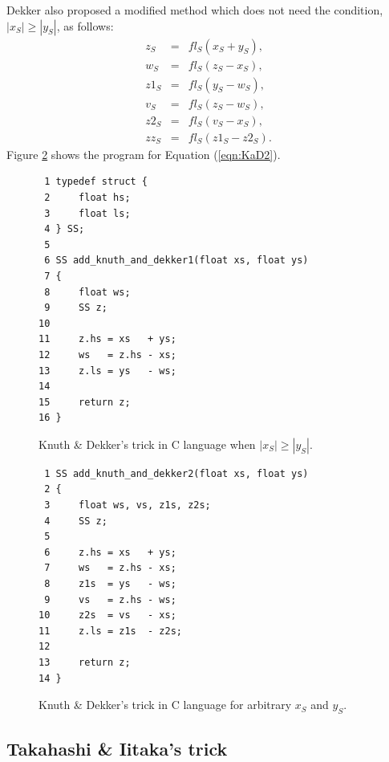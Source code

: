 Dekker also proposed a modified method which does not need the
condition, $|x_S|\geq |y_S|$, as follows:
\begin{eqnarray}
z_S &=& fl_S(x_S + y_S),\nonumber \\
w_S &=& fl_S(z_S - x_S),\nonumber \\
z1_S &=& fl_S(y_S - w_S),\nonumber \\
v_S &=& fl_S(z_S - w_S),\label{eqn:KaD2}\\
z2_S &=& fl_S(v_S - x_S),\nonumber \\
zz_S &=& fl_S(z1_S - z2_S).\nonumber
\end{eqnarray}
Figure \ref{fig:KaD2} shows the program for Equation (\ref{eqn:KaD2}).


\begin{figure}
\begin{center}\footnotesize
\begin{minipage}{100mm}\def\baselinestretch{0.8}
\begin{verbatim}
 1 typedef struct {
 2     float hs;
 3     float ls;
 4 } SS;
 5 
 6 SS add_knuth_and_dekker1(float xs, float ys)
 7 {
 8     float ws;
 9     SS z;
10 
11     z.hs = xs   + ys;
12     ws   = z.hs - xs;
13     z.ls = ys   - ws;
14 
15     return z;
16 }
\end{verbatim}\def\baselinestretch{1.0}
\end{minipage}
\caption{Knuth \& Dekker's trick in C language when $|x_S|\geq |y_S|$.}
\label{fig:KaD1}
\end{center}
\end{figure}

\begin{figure}
\begin{center}\footnotesize
\begin{minipage}{100mm}\def\baselinestretch{0.8}
\begin{verbatim}
 1 SS add_knuth_and_dekker2(float xs, float ys)
 2 {
 3     float ws, vs, z1s, z2s;
 4     SS z;
 5 
 6     z.hs = xs   + ys;
 7     ws   = z.hs - xs;
 8     z1s  = ys   - ws;
 9     vs   = z.hs - ws;
10     z2s  = vs   - xs;
11     z.ls = z1s  - z2s;
12 
13     return z;
14 }
\end{verbatim}\def\baselinestretch{1.0}
\end{minipage}
\caption{Knuth \& Dekker's trick in C language for arbitrary $x_S$ and $y_S$.}
\label{fig:KaD2}
\end{center}
\end{figure}

\subsection{Takahashi \& Iitaka's trick}

